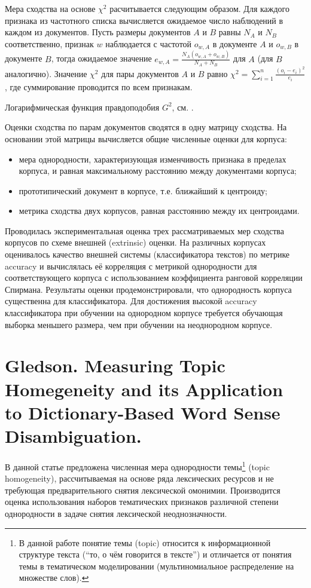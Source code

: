 Мера сходства на основе $\chi^2$ расчитывается следующим образом. Для каждого признака из частотного списка вычисляется ожидаемое число наблюдений в каждом из документов. Пусть размеры документов $A$ и $B$ равны $N_A$ и $N_B$ соответственно, признак $w$ наблюдается с частотой $o_{w,A}$ в документе $A$ и $o_{w,B}$ в документе $B$, тогда ожидаемое значение $e_{w,A} = \frac{N_A(o_{w,A}+o_{w,B})}{N_A+N_B}$ для $A$ (для $B$ аналогично). Значение $\chi^2$ для пары документов $A$ и $B$ равно $\chi^2 = \sum_{i=1}^{n}\frac{(o_i-e_i)^2}{e_i}$, где суммирование проводится по всем признакам.

Логарифмическая функция правдоподобия $G^2$, см. \parencite{dunning1993accurate}.

Оценки сходства по парам документов сводятся в одну матрицу сходства. На основании этой матрицы вычисляется общие численные оценки для корпуса:
\begin{itemize}
    \item мера однородности, характеризующая изменчивость признака в пределах корпуса, и равная максимальному расстоянию между документами корпуса;
    \item прототипический документ в корпусе, т.е. ближайший к центроиду;
    \item метрика сходства двух корпусов, равная расстоянию между их центроидами.
\end{itemize}

Проводилась экспериментальная оценка трех рассматриваемых мер сходства корпусов по схеме внешней (extrinsic) оценки. На различных корпусах оценивалось качество внешней системы (классификатора текстов) по метрике accuracy и вычислялась её корреляция с метрикой однородности для соответствующего корпуса с использованием коэффициента ранговой корреляции Спирмана. Результаты оценки продемонстрировали, что однородность корпуса существенна для классификатора. Для достижения высокой accuracy классификатора при обучении на однородном корпусе требуется обучающая выборка меньшего размера, чем при обучении на неоднородном корпусе.


\section{Gledson. Measuring Topic Homegeneity and its Application to Dictionary-Based Word Sense Disambiguation.}

В данной статье предложена численная мера однородности темы\footnote{В данной работе понятие темы (topic) относится к информационной структуре текста (``то, о чём говорится в тексте'') и отличается от понятия темы в тематическом моделировании (мультиномиальное распределение на множестве слов).} (topic homogeneity), рассчитываемая на основе ряда лексических ресурсов и не требующая предварительного снятия лексической омонимии. Производится оценка использования наборов тематических признаков различной степени однородности в задаче снятия лексической неоднозначности.

